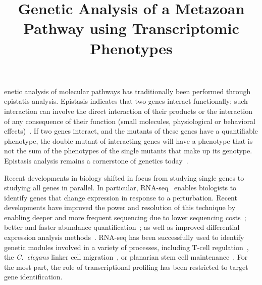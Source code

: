 \documentclass[9pt,twocolumn,twoside]{pnas-new}
\title{Genetic Analysis of a Metazoan Pathway using Transcriptomic Phenotypes}
\newcommand{\cel}{\emph{C.~elegans}}
\begin{document}
\verticaladjustment{-2pt}

\maketitle
\thispagestyle{firststyle}

enetic analysis of molecular pathways has traditionally been performed
through epistatis analysis. Epistasis indicates that two genes interact
functionally; such interaction can involve the direct interaction of their
products or the interaction of any consequence of their function (small molecules,
physiological or behavioral effects)~\cite{Huang2006}. If two
genes interact, and the mutants of these genes have a quantifiable phenotype,
the double mutant of interacting genes will have a phenotype that is not the sum
of the phenotypes of the single mutants that make up its genotype. Epistasis
analysis remains a cornerstone of genetics today~\cite{Phillips2008}.

Recent developments in biology shifted in focus from studying single
genes to studying all genes in parallel. In particular,
RNA-seq~\cite{Mortazavi2008} enables biologists to
identify genes that change expression in response to a perturbation. Recent
developments have improved the power and resolution of this technique by enabling
deeper and more frequent sequencing due to lower sequencing costs~\cite{Metzker2010};
better and faster abundance quantification~\cite{Patro2014,Bray2016,Patro2015};
as well as improved differential expression analysis
methods~\cite{Pimentel2016,Trapnell2013}. RNA-seq has been
successfully used to identify genetic modules involved in a variety of processes,
including T-cell regulation~\cite{Singer2016,Shalek2013}, the \cel{} linker
cell migration~\cite{Schwarz2012}, or planarian stem cell
maintenance~\cite{VanWolfswinkel2014,Scimone2014}. For the most part, the role of
transcriptional profiling has been restricted to target gene identification.
\end{document}
